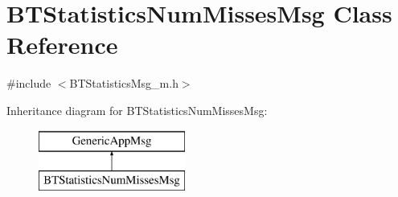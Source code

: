\hypertarget{classBTStatisticsNumMissesMsg}{}\section{B\+T\+Statistics\+Num\+Misses\+Msg Class Reference}
\label{classBTStatisticsNumMissesMsg}


{\ttfamily \#include $<$B\+T\+Statistics\+Msg\+\_\+m.\+h$>$}

Inheritance diagram for B\+T\+Statistics\+Num\+Misses\+Msg\+:\begin{figure}[H]
\begin{center}
\leavevmode
\includegraphics[height=2.000000cm]{classBTStatisticsNumMissesMsg}
\end{center}
\end{figure}
